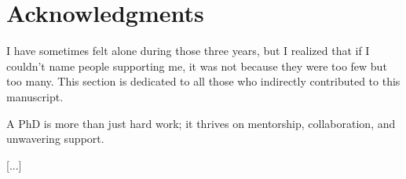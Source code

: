 \chapter*{Acknowledgments}

I have sometimes felt alone during those three years, but I realized that if I couldn't name people supporting me, it was not because they were too few but too many.
This section is dedicated to all those who indirectly contributed to this manuscript.

A PhD is more than just hard work; it thrives on mentorship, collaboration, and unwavering support.

[...]